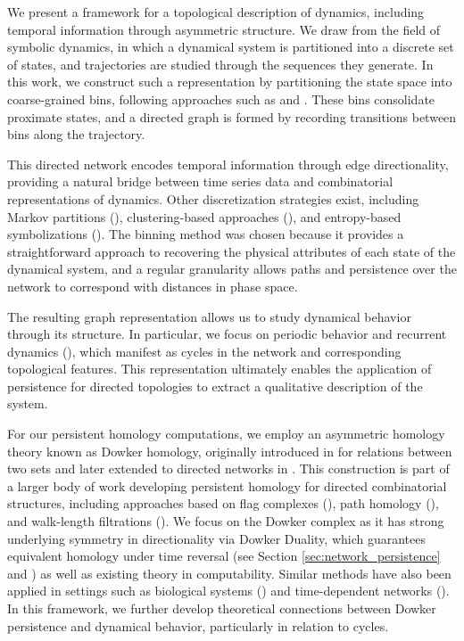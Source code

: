 \documentclass[pdflatex,bst/sn-mathphys-num]{sn-jnl}%
\theoremstyle{thmstyleone}%
\theoremstyle{definition}
\theoremstyle{thmstyletwo}%
\theoremstyle{thmstylethree}%
\begin{document}
We present a framework for a topological description of dynamics, including temporal information through asymmetric structure. We draw from the field of symbolic dynamics, in which a dynamical system is partitioned into a discrete set of states, and trajectories are studied through the sequences they generate. In this work, we construct such a representation by partitioning the state space into coarse-grained bins, following approaches such as \cite{molkenthin_networks_2014} and \cite{Myers_2023}. These bins consolidate proximate states, and a directed graph is formed by recording transitions between bins along the trajectory.

This directed network encodes temporal information through edge directionality, providing a natural bridge between time series data and combinatorial representations of dynamics. Other discretization strategies exist, including Markov partitions (\cite{Adler_1996}), clustering-based approaches (\cite{Franch2020}), and entropy-based symbolizations (\cite{Galatolo2010}). The binning method was chosen because it provides a straightforward approach to recovering the physical attributes of each state of the dynamical system, and a regular granularity allows paths and persistence over the network to correspond with distances in phase space.

The resulting graph representation allows us to study dynamical behavior through its structure. In particular, we focus on periodic behavior and recurrent dynamics (\cite{Bauer_Hien_Junge_Mischaikow_2025,Strommen_2022}), which manifest as cycles in the network and corresponding topological features. This representation ultimately enables the application of persistence for directed topologies to extract a qualitative description of the system.


For our persistent homology computations, we employ an asymmetric homology theory known as Dowker homology, originally introduced in \cite{Dowker_1952} for relations between two sets and later extended to directed networks in \cite{Chowdhury_Memoli_2016}. This construction is part of a larger body of work developing persistent homology for directed combinatorial structures, including approaches based on flag complexes (\cite{chaplin_notion_2024, luet2019Flagser}), path homology (\cite{Grigor'yan20}), and walk-length filtrations (\cite{Munoz_Munch_Khasawneh_2025}). 
We focus on the Dowker complex as it has strong underlying symmetry in directionality via Dowker Duality, which guarantees equivalent homology under time reversal  (see Section \ref{sec:network_persistence} and \cite{Dowker_1952}) as well as existing theory in computability.
Similar methods have also been applied in settings such as biological systems (\cite{Peek_Pritam_Skerritt_Chalup_2025}) and time-dependent networks (\cite{Ye_Jiang_Jiang_Li_2023}). In this framework, we further develop theoretical connections between Dowker persistence and dynamical behavior, particularly in relation to cycles.
\end{document}
